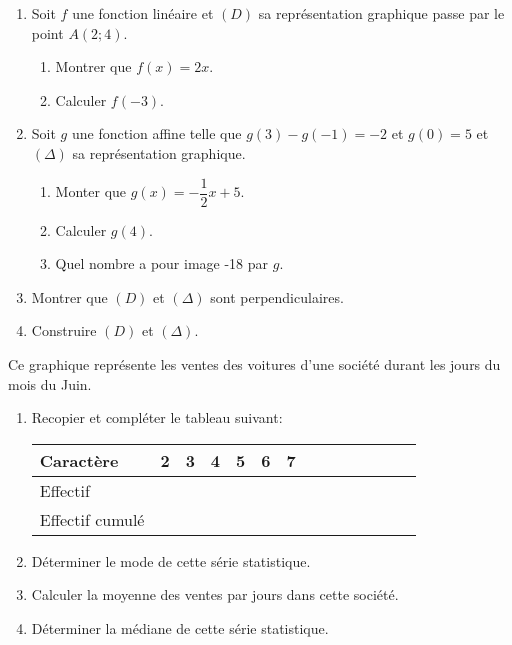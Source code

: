 \documentclass[a4paper,12pt]{article}
\begin{document}
\devoir[sem=2,prv=true,ds=false,num=6 ,niv=3 ,date=29/05/2023,Rdate=01/06/2023]

\begin{exo}
\begin{enumerate}
\item Soit $f$ une fonction linéaire et $(D)$ sa représentation graphique passe par le point $A(2;4)$.
\begin{enumerate}
\item Montrer que $f(x)=2x$.
\item Calculer $f(-3)$.
\end{enumerate}
\item Soit $g$ une fonction affine telle que $g(3)-g(-1)=-2$ et $g(0)=5$ et $(\Delta)$ sa représentation graphique.
\begin{enumerate}
\item Monter que $g(x)=-\dfrac{1}{2}x+5$.
\item Calculer $g(4)$.
\item Quel nombre a pour image -18 par $g$.
\end{enumerate}
\item Montrer que $(D)$ et $(\Delta)$ sont perpendiculaires.
\item Construire  $(D)$ et $(\Delta)$.
\end{enumerate}
\end{exo}

\begin{exo}
\begin{minipage}{.5\linewidth}
Ce graphique représente les ventes des voitures d'une société durant les jours du mois du Juin.
\begin{enumerate}
\item Recopier et compléter le tableau suivant:
\begin{EnvFullwidth}
\begin{tabular}{|*7{Oc|}}
\hline 
Caractère & 2 & 3 & 4 & 5 & 6 & 7 \\ 
\hline 
Effectif &  &  &  &  &  &  \\ 
\hline 
Effectif cumulé  &  &  &  &  &  &  \\ 
\hline 
\end{tabular}
\end{EnvFullwidth}
\item Déterminer le mode de cette série statistique.
\item Calculer la moyenne des ventes par jours dans cette société.
\item Déterminer la médiane de cette série statistique. 
\end{enumerate}
\end{minipage}%
\begin{minipage}{.5\linewidth}
\end{minipage}
\end{exo}
\end{document}
